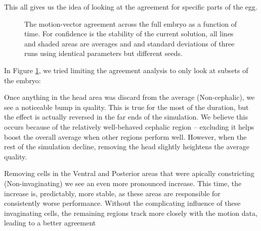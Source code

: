 This all gives us the idea of looking at the agreement for specific parts of the egg.



\begin{figure}[H]
    \centering
    \caption{The motion-vector agreement across the full embryo as a function of time. For confidence is the stability of the current solution, all lines and shaded areas are averages and and standard deviations of three runs using identical parameters but different seeds.}
    \label{fig:vector-subsets}
\end{figure}

In Figure \ref{fig:vector-subsets}, we tried limiting the agreement analysis to only look at subsets of the embryo:

Once anything in the head area was discard from the average (Non-cephalic), we see a noticeable bump in quality. This is true for the most of the duration, but the effect is actually reversed in the far ends of the simulation. We believe this occurs because of the relatively well-behaved cephalic region --  excluding it helps boost the overall average when other regions perform well. However, when the rest of the simulation decline, removing the head slightly heightens the average quality. 

Removing cells in the Ventral and Posterior areas that were apically constricting (Non-invaginating) we see an even more pronounced increase. This time, the increase is, predictably, more stable, as these areas are responsible for consistently worse performance. Without the complicating influence of these invaginating cells, the remaining regions track more closely with the motion data, leading to a better  agreement

